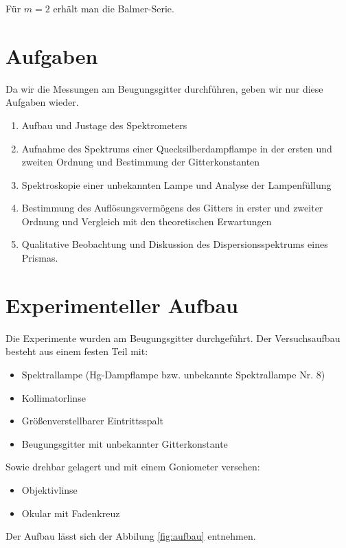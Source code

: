 \documentclass[a4paper,german,12pt,smallheadings]{scrartcl}
\begin{document}
Für $m = 2$ erhält man die Balmer-Serie.

\newpage
\section{Aufgaben}
Da wir die Messungen am Beugungsgitter durchführen, geben wir nur diese
Aufgaben wieder.

\begin{enumerate}
  \item Aufbau und Justage des Spektrometers
  \item Aufnahme des Spektrums einer Quecksilberdampflampe in der ersten und
    zweiten Ordnung und Bestimmung der Gitterkonstanten
  \item Spektroskopie einer unbekannten Lampe und Analyse der Lampenfüllung
  \item Bestimmung des Auflösungsvermögens des Gitters in erster und zweiter
    Ordnung und Vergleich mit den theoretischen Erwartungen
  \item Qualitative Beobachtung und Diskussion des Dispersionsspektrums eines
    Prismas.
\end{enumerate}

\section{Experimenteller Aufbau}

Die Experimente wurden am Beugungsgitter durchgeführt. Der Versuchsaufbau
besteht aus einem festen Teil mit:

\begin{itemize}
  \item Spektrallampe (Hg-Dampflampe bzw. unbekannte Spektrallampe Nr. 8)
  \item Kollimatorlinse
  \item Größenverstellbarer Eintrittsspalt
  \item Beugungsgitter mit unbekannter Gitterkonstante
\end{itemize}

Sowie drehbar gelagert und mit einem Goniometer versehen:

\begin{itemize}
  \item Objektivlinse
  \item Okular mit Fadenkreuz
\end{itemize}

Der Aufbau lässt sich der Abbilung \ref{fig:aufbau} entnehmen.
\end{document}
